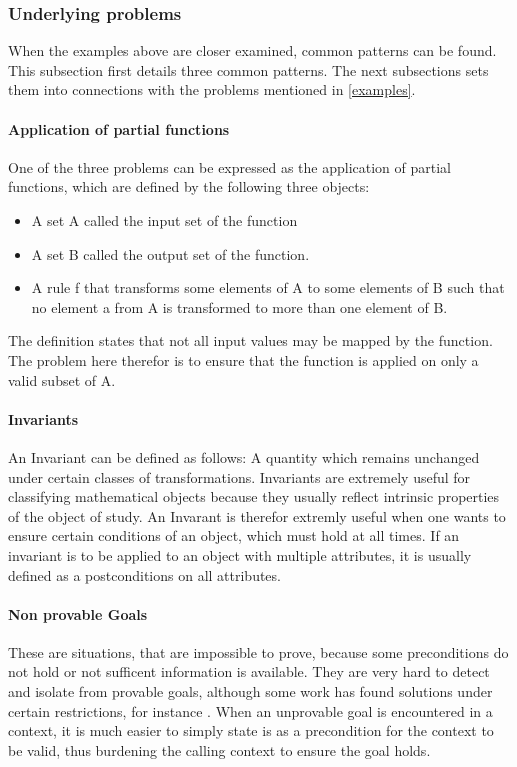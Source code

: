 \subsubsection{Underlying problems}
When the examples above are closer examined, common patterns can be found. This subsection first details three common patterns. The next subsections sets them into connections with the problems mentioned in \ref{examples}.

\paragraph{Application of partial functions} \label{partial function}
One of the three problems can be expressed as the application of partial functions, which are defined by the following three objects:
\begin{itemize}
	\item A set A called the input set of the function
	\item A set B called the output set of the function.
	\item A rule f that transforms some elements of A to some elements of B such that no element a from A is transformed to more than one element of B.\cite[197]{khoussainov}
\end{itemize}
The definition states that not all input values may be mapped by the function. The problem here therefor is to ensure that the function is applied on only a valid subset of A.


\paragraph{Invariants} \label{invariants}
An Invariant can be defined as follows: A quantity which remains unchanged under certain classes of transformations. Invariants are extremely useful for classifying mathematical objects because they usually reflect intrinsic properties of the object of study.\cite[282ff]{hunt}
\newline An Invarant is therefor extremly useful when one wants to ensure certain conditions of an object, which must hold at all times. If an invariant is to be applied to an object with multiple attributes, it is usually defined as a postconditions on all attributes. 

\paragraph{Non provable Goals} \label{non provable goal}
These are situations, that are impossible to prove, because some preconditions do not hold or not sufficent information is available. They are very hard to detect and isolate from provable goals, although some work has found solutions under certain restrictions, for instance \cite{goals}. When an unprovable goal is encountered in a context, it is much easier to simply state is as a precondition for the context to be valid, thus burdening the calling context to ensure the goal holds. 


